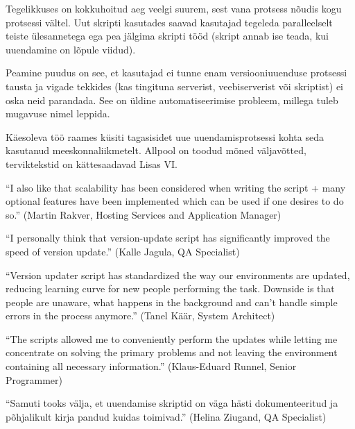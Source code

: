 \documentclass[12pt]{article}
\begin{document}
  Tegelikkuses on kokkuhoitud aeg veelgi suurem, sest vana protsess nõudis kogu protsessi vältel. Uut skripti kasutades saavad kasutajad tegeleda paralleelselt teiste ülesannetega ega pea jälgima skripti tööd (skript annab ise teada, kui uuendamine on lõpule viidud).
  
  Peamine puudus on see, et kasutajad ei tunne enam versiooniuuenduse protsessi tausta ja vigade tekkides (kas tingituna serverist, veebiserverist või skriptist) ei oska neid parandada. See on üldine automatiseerimise probleem, millega tuleb mugavuse nimel leppida.
  
   Käesoleva töö raames küsiti tagasisidet uue uuendamisprotsessi kohta seda kasutanud meeskonnaliikmetelt. Allpool on toodud mõned väljavõtted, terviktekstid on kättesaadavad Lisas VI.
   
   \begin{displayquote}
   ``I also like that scalability has been considered when writing the script + many optional features have been implemented which can be used if one desires to do so.'' (Martin Rakver, Hosting Services and Application Manager)
   \end{displayquote}
   
   \begin{displayquote}
   ``I personally think that version-update script has significantly improved the speed of version update.'' (Kalle Jagula, QA Specialist)
   \end{displayquote}
   
   \begin{displayquote}
    ``Version updater script has standardized the way our environments are updated, reducing learning curve for new people performing the task. Downside is that people are unaware, what happens in the background and can't handle simple errors in the process anymore.'' (Tanel Käär, System Architect)
    \end{displayquote}
    
    \begin{displayquote}
    ``The scripts allowed me to conveniently perform the updates while letting me concentrate on solving the primary problems and not leaving the environment containing all necessary information.'' (Klaus-Eduard Runnel, Senior Programmer)
    \end{displayquote}
    
    \begin{displayquote}
    ``Samuti tooks välja, et uuendamise skriptid on väga hästi dokumenteeritud ja põhjalikult kirja pandud kuidas toimivad.'' (Helina Ziugand, QA Specialist)
    \end{displayquote}
\end{document}
